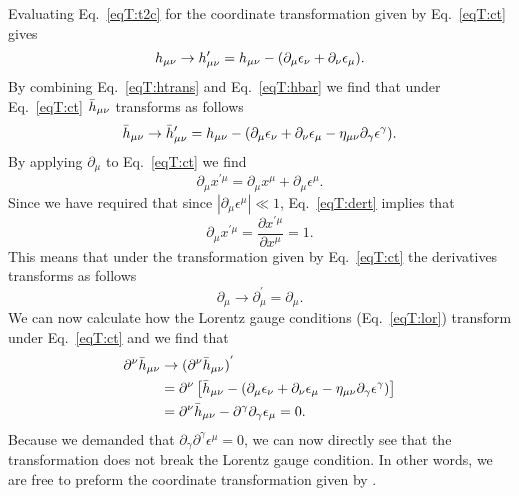 Evaluating Eq.~\ref{eqT:t2c} for the coordinate transformation given by Eq.~\ref{eqT:ct} gives
\begin{equation} \label{eqT:htrans}
h_{\mu\nu} \rightarrow h'_{\mu\nu} = h_{\mu\nu} - (\partial_{\mu} \epsilon_{\nu} + \partial_{\nu} \epsilon_{\mu}). 
\end{equation}
By combining Eq.~\ref{eqT:htrans} and Eq.~\ref{eqT:hbar} we find that under Eq.~\ref{eqT:ct} $\bar{h}_{\mu\nu}$ transforms as follows
\begin{equation} \label{eqT:hbartrans}
\bar{h}_{\mu\nu} \rightarrow \bar{h}'_{\mu\nu} =  {h}_{\mu\nu} - (\partial_{\mu} \epsilon_{\nu} + \partial_{\nu} \epsilon_{\mu} - \eta_{\mu\nu}\partial_{\gamma} \epsilon^{\gamma}). 
\end{equation}
By applying  $\partial_{\mu}$ to Eq.~\ref{eqT:ct} we find
\begin{equation} \label{eqT:dert}
\partial_{\mu} x^{'\mu} = \partial_{\mu} x^{\mu} + \partial_{\mu} \epsilon^{\mu}.
\end{equation}
Since we have required that since $|\partial_{\mu} \epsilon^{\mu}| \ll 1$,  Eq.~\ref{eqT:dert} implies that
\begin{equation}
\partial_{\mu} x^{'\mu} = \frac{\partial x^{'\mu} }{\partial x^{\mu}} = 1.
\end{equation}
This means that under the transformation given by Eq.~\ref{eqT:ct} the derivatives
transforms as follows
\begin{equation} \label{eqT:dert2}
\partial_{\mu} \rightarrow \partial_{\mu}^{'} = \partial_{\mu}.
\end{equation}
We can now calculate how the Lorentz gauge conditions (Eq.~\ref{eqT:lor}) transform under Eq.~\ref{eqT:ct} and we
find that
\begin{align} \label{eqT:lort}
\partial^{\nu} \bar{h}_{\mu\nu} & \rightarrow (\partial^{\nu} \bar{h}_{\mu\nu})^{'} \\ \nonumber
&= \partial^{\nu} \left [ \bar{h}_{\mu\nu} - (\partial_{\mu} \epsilon_{\nu} + \partial_{\nu} \epsilon_{\mu} - \eta_{\mu\nu}\partial_{\gamma} \epsilon^{\gamma}) \right ] \\
&= \partial^{\nu} \bar{h}_{\mu\nu} - \partial^{\gamma} \partial_{\gamma} \epsilon_{\mu} = 0. \nonumber
\end{align}
Because we demanded that $\partial_{\gamma} \partial^{\gamma} \epsilon^{\mu} = 0$, we can now directly see 
that the transformation does not break the Lorentz gauge condition. In other words, we
are free to preform the coordinate transformation given by .

